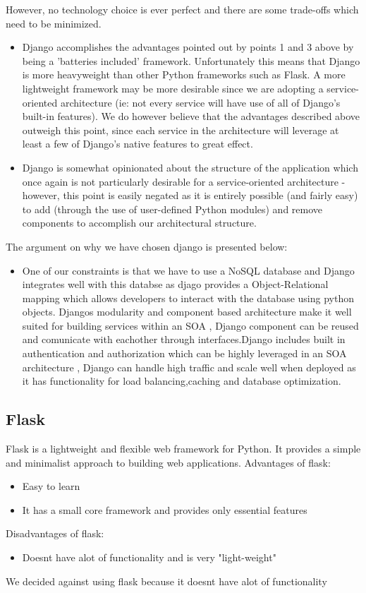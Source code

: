 \documentclass[12pt]{article}
\begin{document}
However, no technology choice is ever perfect and there are some trade-offs which need to be minimized.
\begin{itemize}
    \item Django accomplishes the advantages pointed out by points 1 and 3 above by being a 'batteries included' framework. Unfortunately this means that Django is more heavyweight than other Python frameworks such as Flask. A more lightweight framework may be more desirable since we are adopting a service-oriented architecture (ie: not every service will have use of all of Django's built-in features). We do however believe that the advantages described above outweigh this point, since each service in the architecture will leverage at least a few of Django's native features to great effect.
    \item Django is somewhat opinionated about the structure of the application which once again is not particularly desirable for a service-oriented architecture - however, this point is easily negated as it is entirely possible (and fairly easy) to add (through the use of user-defined Python modules) and remove components to accomplish our architectural structure.
\end{itemize}
The argument on why we have chosen django is presented below:
\begin{itemize}
    \item One of our constraints is that we have to use a NoSQL database and Django integrates well with this databse as djago provides a Object-Relational mapping which allows developers to interact with the database using python objects. Djangos modularity and component based architecture make it well suited for building services within an SOA , Django component can be reused and comunicate with eachother through interfaces.Django includes built in authentication and authorization which can be highly leveraged in an SOA architecture , Django can handle high traffic and scale well when deployed as it has functionality for load balancing,caching and database optimization.
\end{itemize}

\subsection{Flask}
Flask is a lightweight and flexible web framework for Python. It provides a simple and minimalist approach to building web applications.
Advantages of flask:
\begin{itemize}
    \item Easy to learn 
    \item It has a small core framework and provides only essential features
\end{itemize}
Disadvantages of flask:
\begin{itemize}
    \item Doesnt have alot of functionality and is very "light-weight"
\end{itemize}
We decided against using flask because it doesnt have alot of functionality 
\end{document}
